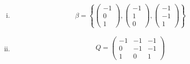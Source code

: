 \begin{enumerate}
\begin{enumerate}[(i)]
\begin{itemize}
\begin{gather}
\right)\\
\begin{pmatrix}
-1 & -2 & -3\\
-1 & 0  & -1\\
2 & 2 & 4
\end{pmatrix}v = 0\\
\begin{pmatrix}
-1 & -2 & -3\\
-1 & 0  & -1\\
2 & 2 & 4
\end{pmatrix}
\leadsto
\begin{pmatrix}
1 & 0 & 1\\
0 & 1 & 1\\
0 & 0 & 0
\end{pmatrix}
\end{gather}
\begin{align}
x_1 &= -t\\
x_2 &= -t\\
x_3 &= t
\end{align}
\begin{equation}
v= \left\{t\begin{pmatrix}-1\\-1\\1\end{pmatrix}\colon t \in \mathbb{R}\right\}
\end{equation}
\end{itemize}
\item \begin{equation}
\beta = \left\{\begin{pmatrix}-1\\0\\1\end{pmatrix},\begin{pmatrix}-1\\1\\0\end{pmatrix},\begin{pmatrix}-1\\-1\\1\end{pmatrix}\right\}
  \end{equation}
\item \begin{gather}
Q = \begin{pmatrix}
-1 & -1 & -1\\
0 & -1 & -1\\
1 & 0 & 1
\end{pmatrix}\\

\end{gather}
\end{enumerate}
\end{enumerate}
